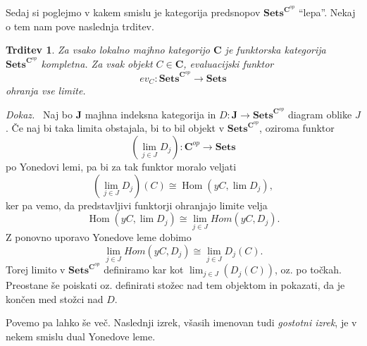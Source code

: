\documentclass[12pt,a4paper]{book}
\theoremstyle{definition}
\theoremstyle{plain}
\newtheorem{trditev}[definicija]{Trditev}
\newenvironment{dokaz}{\emph{Dokaz.}\ }{\hspace{\fill}{$\Box$}}
\theoremstyle{definition}
\theoremstyle{remark}
\newcommand{\cat}[1]{\textbf{#1}}
\DeclareMathOperator{\Hom}{Hom}
\newcommand{\predsnop}[1]{\cat{Sets}^{\cat{#1}^{op}}}
\begin{document}
Sedaj si poglejmo v kakem smislu je kategorija predsnopov $\predsnop{C}$ "`lepa"'. Nekaj o tem nam pove naslednja trditev.

\begin{trditev} \label{trditev 3.3}
Za vsako lokalno majhno kategorijo $\cat{C}$ je funktorska kategorija $\predsnop{C}$ kompletna. Za vsak objekt $C \in \cat{C}$, evaluacijski funktor 
$$ev_C : \predsnop{C} \to \cat{Sets}$$
ohranja vse limite.
\end{trditev}
\begin{dokaz}
Naj bo \cat{J} majhna indeksna kategorija in $D : \cat{J} \to \cat{Sets}^{\cat{C}^{op}}$ diagram oblike $J$. Če naj bi taka limita obstajala, bi to bil objekt v $\cat{Sets}^{\cat{C}^{op}}$, oziroma funktor 
$$(\lim_{j \in J} D_j): \cat{C}^{op} \to \cat{Sets}$$
po Yonedovi lemi, pa bi za tak funktor moralo veljati
$$(\lim_{j \in J} D_j)(C) \cong \Hom(yC, \lim D_j),$$
ker pa vemo, da predstavljivi funktorji ohranjajo limite velja
$$\Hom(yC, \lim D_j) \cong \lim_{j \in J} Hom(yC, D_j).$$
Z ponovno uporavo Yonedove leme dobimo
$$\lim_{j \in J} Hom(yC, D_j) \cong \lim_{j \in J} D_j(C).$$
Torej limito v $\predsnop{C}$ definiramo kar kot $\lim_{j \in J} (D_j(C))$, oz. po točkah.
Preostane še poiskati oz. definirati stožec nad tem objektom in pokazati, da je končen med stožci nad $D$.



\end{dokaz}

Povemo pa lahko še več. Naslednji izrek, všasih imenovan tudi \emph{gostotni izrek}, je v nekem smislu dual Yonedove leme.
\end{document}
